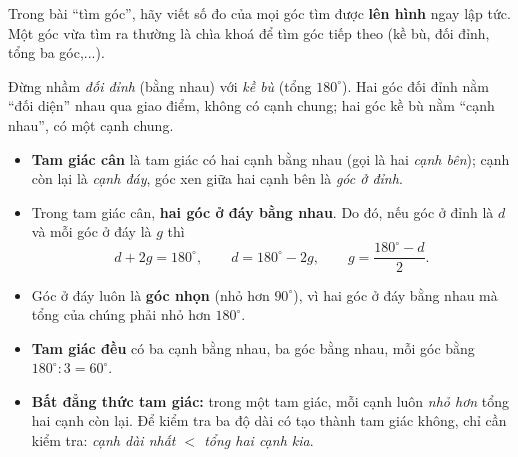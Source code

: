 \begin{tipbox}
Trong bài ``tìm góc'', hãy viết số đo của mọi góc tìm được \textbf{lên hình} ngay lập tức. Một góc vừa tìm ra thường là chìa khoá để tìm góc tiếp theo (kề bù, đối đỉnh, tổng ba góc,...).
\end{tipbox}

\begin{warnbox}
Đừng nhầm \emph{đối đỉnh} (bằng nhau) với \emph{kề bù} (tổng $180^\circ$). Hai góc đối đỉnh nằm ``đối diện'' nhau qua giao điểm, không có cạnh chung; hai góc kề bù nằm ``cạnh nhau'', có một cạnh chung.
\end{warnbox}

\begin{knowbox}
\begin{itemize}[leftmargin=1.3em,itemsep=2pt,topsep=2pt]
  \item \textbf{Tam giác cân} là tam giác có hai cạnh bằng nhau (gọi là hai \emph{cạnh bên}); cạnh còn lại là \emph{cạnh đáy}, góc xen giữa hai cạnh bên là \emph{góc ở đỉnh}.
  \item Trong tam giác cân, \textbf{hai góc ở đáy bằng nhau}. Do đó, nếu góc ở đỉnh là $d$ và mỗi góc ở đáy là $g$ thì
  \[ d+2g=180^\circ,\qquad d=180^\circ-2g,\qquad g=\frac{180^\circ-d}{2}. \]
  \item Góc ở đáy luôn là \textbf{góc nhọn} (nhỏ hơn $90^\circ$), vì hai góc ở đáy bằng nhau mà tổng của chúng phải nhỏ hơn $180^\circ$.
  \item \textbf{Tam giác đều} có ba cạnh bằng nhau, ba góc bằng nhau, mỗi góc bằng $180^\circ:3=60^\circ$.
  \item \textbf{Bất đẳng thức tam giác:} trong một tam giác, mỗi cạnh luôn \emph{nhỏ hơn} tổng hai cạnh còn lại. Để kiểm tra ba độ dài có tạo thành tam giác không, chỉ cần kiểm tra: \emph{cạnh dài nhất $<$ tổng hai cạnh kia}.
\end{itemize}
\end{knowbox}

